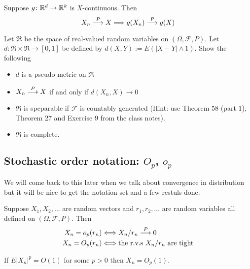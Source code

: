 \begin{theorem}
\label{continuous mapping  P}
Suppose $g\colon\Bbb R^d\rightarrow\Bbb R^k$ is $X$-continuous. Then
\[X_n \overset{\small P} \longrightarrow X \Longrightarrow g(X_n) \overset{\small P} \longrightarrow g(X) \]
\end{theorem}



\begin{exercise}
Let $\mathfrak R$ be the space of real-valued random variables on $(\Omega, \mathcal F, P)$. Let $d\colon  \mathfrak R \times \mathfrak R \rightarrow [0,1]$ be defined by $d(X,Y):= E(|X-Y|\wedge 1)$. Show the following
\begin{itemize}
\item $d$ is a pseudo metric on $\mathfrak R$
\item $X_n\overset{\small P} \longrightarrow X$ if and only if $d(X_n, X)\rightarrow 0$
\item $\mathfrak R$ is speparable if $\mathcal F$ is countably generated (Hint: use Theorem 58 (part 1), Theorem 27 and Exercise 9 from the class notes).
\item $\mathfrak R$ is complete.
\end{itemize} 
\end{exercise}




%
%
\subsection{Stochastic order notation: $O_p$, $o_p$}
We will come back to this later when we talk about convergence in distribution but it will be nice to get the notation set and a few restuls done. 


\begin{definition}
Suppose $X_1, X_2, \ldots$ are random vectors and $r_1, r_2, \ldots$ are random variables all defined on $(\Omega,\mathcal F, P)$. Then
\begin{align*}
X_n = o_p(r_n)&\Longleftrightarrow X_n/r_n \overset{\small P} \longrightarrow  0 \\
X_n = O_p(r_n)&\Longleftrightarrow \text{the {\rm r.v.s} $X_n/r_n$ are tight}
\end{align*}
\end{definition}

\begin{claim}
If $E|X_n|^p=O(1)$ for some $p>0$ then $X_n = O_p(1)$.
\end{claim}



